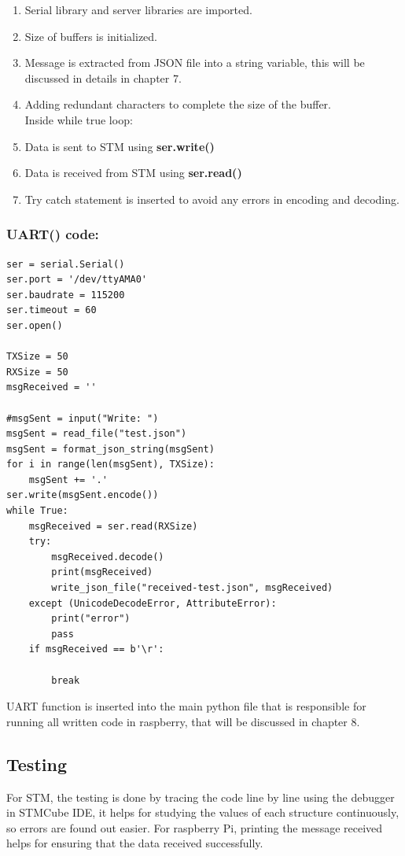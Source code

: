 \begin{enumerate}
    \item Serial library and server libraries are imported.
    \item Size of buffers is initialized.
    \item Message is extracted from JSON file into a string variable, this will be discussed in details in chapter 7.
    \item Adding redundant characters to complete the size of the buffer. \\ \textbf{}{Inside while true loop:}
    \item Data is sent to STM using \textbf{ser.write()}
    \item Data is received from STM using \textbf{ser.read()}
    \item Try catch statement is inserted to avoid any errors in encoding and decoding.
\end{enumerate}

\subsubsection{UART() code: }



\begin{lstlisting}
ser = serial.Serial()
ser.port = '/dev/ttyAMA0'
ser.baudrate = 115200
ser.timeout = 60
ser.open()

TXSize = 50
RXSize = 50
msgReceived = ''

#msgSent = input("Write: ")
msgSent = read_file("test.json")
msgSent = format_json_string(msgSent)
for i in range(len(msgSent), TXSize):
    msgSent += '.'
ser.write(msgSent.encode())
while True:
    msgReceived = ser.read(RXSize)
    try:
        msgReceived.decode()
        print(msgReceived)
        write_json_file("received-test.json", msgReceived)
    except (UnicodeDecodeError, AttributeError):
        print("error")
        pass
    if msgReceived == b'\r':

        break
\end{lstlisting}

UART function is inserted into the main python file that is responsible for running all written code in raspberry, that will be discussed in chapter 8.

\subsection{Testing}
For STM, the testing is done by tracing the code line by line using the debugger in STMCube IDE, it helps for studying the values of each structure continuously, so errors are found out easier. 
For raspberry Pi, printing the message received helps for ensuring that the data received successfully. 

